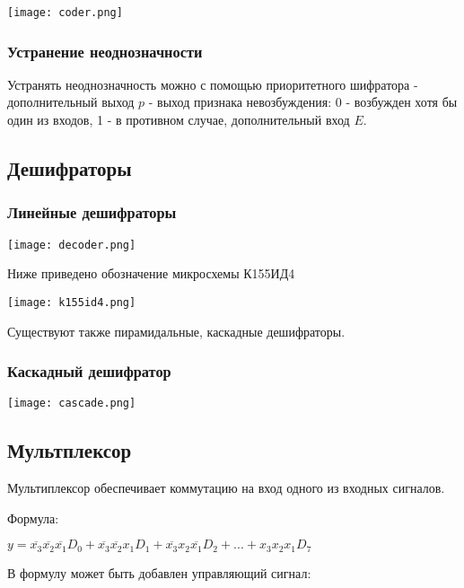 \documentclass{article}
\begin{document}
\begin{flushleft}

\texttt{[image: coder.png]}

\subsubsection{Устранение неоднозначности}

Устранять неоднозначность можно с помощью приоритетного шифратора - дополнительный выход $p$ - выход признака невозбуждения: 0 - возбужден хотя бы один из входов, 1 - в противном случае, дополнительный вход $E$.

\subsection{Дешифраторы}

\subsubsection{Линейные дешифраторы}

\texttt{[image: decoder.png]}

\hfill

Ниже приведено обозначение микросхемы К155ИД4

\hfill

\texttt{[image: k155id4.png]}

Существуют также пирамидальные, каскадные дешифраторы.

\subsubsection{Каскадный дешифратор}

\texttt{[image: cascade.png]}

\subsection{Мультплексор}

Мультиплексор обеспечивает коммутацию на вход одного из входных сигналов.

Формула:

$y = \overline{x_3}\overline{x_2}\overline{x_1}D_0 + \overline{x_3}\overline{x_2}x_1D_1 + \overline{x_3}x_2\overline{x_1}D_2 + ... + x_3x_2x_1D_7$

\hfill

В формулу может быть добавлен управляющий сигнал:


\end{flushleft}
\end{document}

